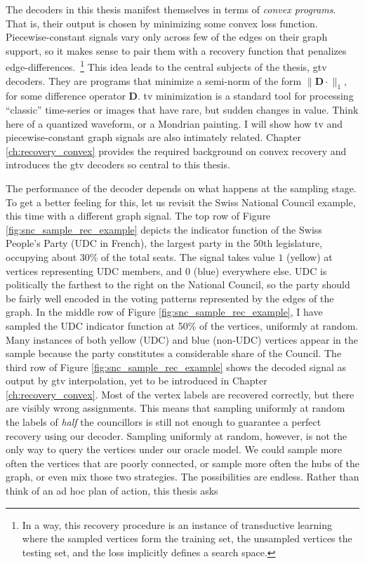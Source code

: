 The decoders in this thesis manifest themselves in terms of \emph{convex programs}. That is, their output is chosen by minimizing some convex loss function. Piecewise-constant signals vary only across few of the edges on their graph support, so it makes sense to pair them with a recovery function that penalizes edge-differences.~\footnote{In a way, this recovery procedure is an instance of transductive learning \cite[Chapter 24]{chapelle2006} where the sampled vertices form the training set, the unsampled vertices the testing set, and the loss implicitly defines a search space.} This idea leads to the central subjects of the thesis, \acrfull{gtv} decoders. They are programs that minimize a semi-norm of the form $\|\mathbf{D} \cdot\|_1$, for some difference operator $\mathbf{D}$. \acrfull{tv} minimization is a standard tool for processing ``classic'' time-series or images that have rare, but sudden changes in value. Think here of a quantized waveform, or a Mondrian painting. I will show how \acrshort{tv} and piecewise-constant graph signals are also intimately related. Chapter \ref{ch:recovery_convex} provides the required background on convex recovery and introduces the \acrshort{gtv} decoders so central to this thesis.

The performance of the decoder depends on what happens at the sampling stage. To get a better feeling for this, let us revisit the Swiss National Council example, this time with a different graph signal. The top row of Figure \ref{fig:snc_sample_rec_example} depicts the indicator function of the Swiss People's Party (UDC in French), the largest party in the 50th legislature, occupying about 30\% of the total seats. The signal takes value $1$ (yellow) at vertices representing UDC members, and $0$ (blue) everywhere else. UDC is politically the farthest to the right on the National Council, so the party should be fairly well encoded in the voting patterns represented by the edges of the graph. In the middle row of Figure \ref{fig:snc_sample_rec_example}, I have sampled the UDC indicator function at 50\% of the vertices, uniformly at random. Many instances of both yellow (UDC) and blue (non-UDC) vertices appear in the sample because the party constitutes a considerable share of the Council. The third row of Figure \ref{fig:snc_sample_rec_example} shows the decoded signal as output by \acrshort{gtv} interpolation, yet to be introduced in Chapter \ref{ch:recovery_convex}. Most of the vertex labels are recovered correctly, but there are visibly wrong assignments. This means that sampling uniformly at random the labels of \emph{half} the councillors is still not enough to guarantee a perfect recovery using our decoder. Sampling uniformly at random, however, is not the only way to query the vertices under our oracle model. We could sample more often the vertices that are poorly connected, or sample more often the hubs of the graph, or even mix those two strategies. The possibilities are endless. Rather than think of an ad hoc plan of action, this thesis asks

